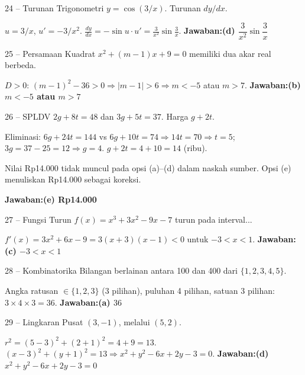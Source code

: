 \documentclass[11pt]{article}
\newcommand{\jawaban}[1]{\textbf{Jawaban:}\enspace\colorbox{gold!30}{\textbf{#1}}}
\begin{document}
\begin{soal}{24 -- Turunan Trigonometri}
$y=\cos(3/x)$. Turunan $dy/dx$.
\end{soal}
\begin{pembox}
$u=3/x$, $u'=-3/x^2$. $\frac{dy}{dx}=-\sin u\cdot u'=\frac{3}{x^2}\sin\frac3x$.
\jawaban{(d) $\dfrac{3}{x^2}\sin\dfrac3x$}
\end{pembox}

\begin{soal}{25 -- Persamaan Kuadrat}
$x^2+(m-1)x+9=0$ memiliki dua akar real berbeda.
\end{soal}
\begin{pembox}
$D>0$: $(m-1)^2-36>0\Rightarrow|m-1|>6\Rightarrow m<-5$ atau $m>7$.
\jawaban{(b) $m<-5$ atau $m>7$}
\end{pembox}

\begin{soal}{26 -- SPLDV}
$2g+8t=48$ dan $3g+5t=37$. Harga $g+2t$.
\end{soal}
\begin{pembox}
Eliminasi: $6g+24t=144$ vs $6g+10t=74\Rightarrow14t=70\Rightarrow t=5$; $3g=37-25=12\Rightarrow g=4$. $g+2t=4+10=14$ (ribu).
\begin{catatan}
Nilai Rp14.000 tidak muncul pada opsi (a)--(d) dalam naskah sumber. Opsi (e) menuliskan Rp14.000 sebagai koreksi.
\end{catatan}
\jawaban{(e) Rp14.000}
\end{pembox}

\begin{soal}{27 -- Fungsi Turun}
$f(x)=x^3+3x^2-9x-7$ turun pada interval...
\end{soal}
\begin{pembox}
$f'(x)=3x^2+6x-9=3(x+3)(x-1)<0$ untuk $-3<x<1$.
\jawaban{(c) $-3<x<1$}
\end{pembox}

\begin{soal}{28 -- Kombinatorika}
Bilangan berlainan antara 100 dan 400 dari $\{1,2,3,4,5\}$.
\end{soal}
\begin{pembox}
Angka ratusan $\in\{1,2,3\}$ (3 pilihan), puluhan 4 pilihan, satuan 3 pilihan: $3\times4\times3=36$.
\jawaban{(a) $36$}
\end{pembox}

\begin{soal}{29 -- Lingkaran}
Pusat $(3,-1)$, melalui $(5,2)$.
\end{soal}
\begin{pembox}
$r^2=(5-3)^2+(2+1)^2=4+9=13$. $(x-3)^2+(y+1)^2=13\Rightarrow x^2+y^2-6x+2y-3=0$.
\jawaban{(d) $x^2+y^2-6x+2y-3=0$}
\end{pembox}
\end{document}
